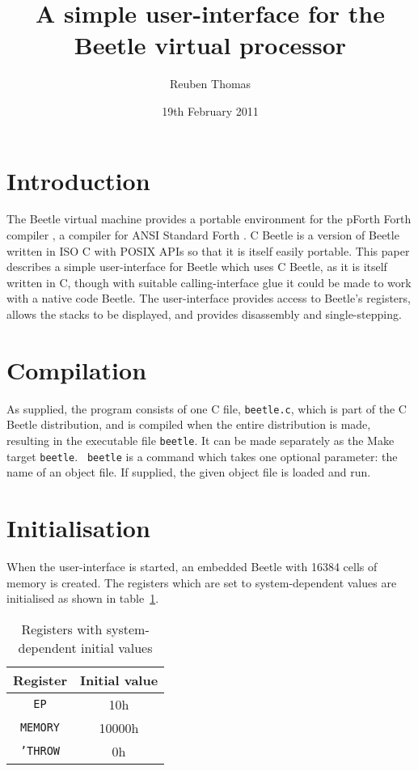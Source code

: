 \documentclass{article}
\title{A simple user-interface for the Beetle virtual processor}
\author{Reuben Thomas}
\date{19th February 2011}
\begin{document}
\maketitle


\section{Introduction}

The Beetle virtual machine \cite{beetle} provides a portable
environment for the pForth Forth compiler \cite{beetledis}, a compiler
for ANSI Standard Forth \cite{ANSIforth}. C Beetle \cite{cbeetle} is
a version of Beetle written in ISO C with POSIX APIs so that it is
itself easily portable. This paper describes a simple user-interface
for Beetle which uses C Beetle, as it is itself written in C, though
with suitable calling-interface glue it could be made to work with a
native code Beetle. The user-interface provides access to Beetle's
registers, allows the stacks to be displayed, and provides disassembly
and single-stepping.


\section{Compilation}

As supplied, the program consists of one C file, {\tt beetle.c}, which
is part of the C Beetle distribution, and is compiled when the entire
distribution is made, resulting in the executable file {\tt beetle}.
It can be made separately as the Make target {\tt beetle}. {\tt
  beetle} is a command which takes one optional parameter: the name of
an object file. If supplied, the given object file is loaded and run.


\section{Initialisation}
\label{uifaceinit}

When the user-interface is started, an embedded Beetle with 16384 cells of
memory is created. The registers which are set to system-dependent values are
initialised as shown in table~\ref{uinittable}.

\begin{table}[htbp]
\begin{center}
\begin{tabular}{|c|c|} \hline
\rule[-2mm]{0mm}{6mm}\bf Register & \bf Initial value \\ \hline
{\tt EP} & 10h \\
{\tt MEMORY} & 10000h \\
{\tt 'THROW} & 0h \\ \hline
\end{tabular}
\caption{\label{uinittable}Registers with system-dependent initial values}
\end{center}
\end{table}
\end{document}
